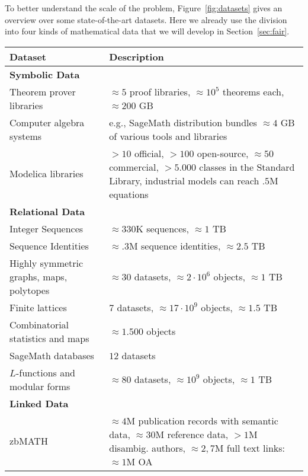 To better understand the scale of the problem, Figure~\ref{fig:datasets} gives an overview over some state-of-the-art datasets.
Here we already use the division into four kinds of mathematical data that we will develop in Section~\ref{sec:fair}.

\begin{figure*}[htp]\centering\small{}
  \begin{tabular}{| p{} | p{}|}\hline
  Dataset & Description \\\hline\hline
  \multicolumn{2}{|l|}{\textbf{Symbolic Data}} \\\hline
  Theorem prover libraries \cite{OAFproject:on}  & $\approx 5$ proof libraries, $\approx 10^5$ theorems each, $\approx 200$ GB \\\hline
  Computer algebra systems \cite{sagemath} & e.g., SageMath distribution bundles $\approx 4$ GB of various tools and libraries\\\hline
  Modelica libraries \cite{Modelica:on} &$> 10$ official, $> 100$ open-source, $\approx 50$ commercial,
      $> 5.000$ classes in the Standard Library, industrial models can reach $.5$M equations \\\hline
  \multicolumn{2}{|l|}{\textbf{Relational Data}} \\\hline
 Integer Sequences \cite{OEIS:on} & $\approx 330$K sequences, $\approx 1$ TB  \\\hline
 Sequence Identities \cite{kwarc:datahost:on} & $\approx .3$M sequence identities, $\approx 2.5$ TB \\\hline
 Highly symmetric graphs, maps, polytopes \cite{ConderCensuses:on, HartleyPolytopes:on, LeemansPolytopes:on, PotocnikCensuses:on, RoyleVT:on, WilsonET:on} & $\approx 30$ datasets, $\approx 2\cdot10^6$ objects, $\approx 1$ TB \\\hline
  Finite lattices \cite{KohLat:on, LeeLat:on, MalLat:on} & $7$ datasets, $\approx 17 \cdot 10^9$ objects, $\approx 1.5$ TB \\\hline
  Combinatorial statistics and maps \cite{findstat} & $\approx1.500$ objects \\\hline
  SageMath databases \cite{SageDB:on} & $12$ datasets \\\hline
  $L$-functions and modular forms \cite{lmfdb:on} & $\approx 80$ datasets, $\approx 10^9$ objects, $\approx 1$ TB \\\hline
  \multicolumn{2}{|l|}{\textbf{Linked Data}} \\\hline
   zbMATH \cite{zbMATH:on} & $\approx 4$M publication records with semantic data, $\approx 30$M reference data, $>1$M disambig. authors, $\approx 2,7$M full text links: $\approx 1$M OA \\\hline

\end{tabular}
\end{figure*}
